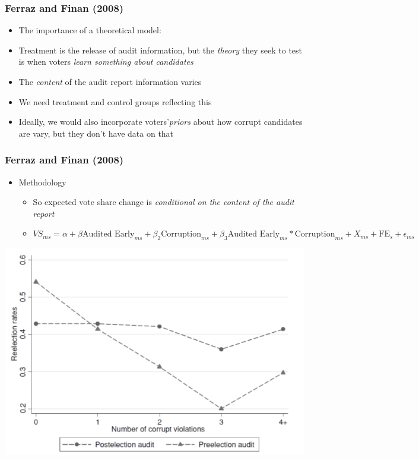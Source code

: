 \documentclass[xcolor=x11names,compress]{beamer}\usepackage[]{graphicx}\usepackage[]{color}
\renewcommand{\(}{\begin{columns}}
\renewcommand{\)}{\end{columns}}
\newcommand{\<}[1]{\begin{column}{#1}}
\renewcommand{\>}{\end{column}}
\begin{document}
\begin{frame}
\frametitle{Ferraz and Finan (2008)}
\begin{itemize}
\item The importance of a theoretical model:
\pause
\item Treatment is the release of audit information, but the \textit{theory} they seek to test is when voters \textit{learn something about candidates}
\pause
\item The \textit{content} of the audit report information varies
\pause
\item We need treatment and control groups reflecting this
\pause
\item Ideally, we would also incorporate voters'\textit{priors} about how corrupt candidates are vary, but they don't have data on that
\end{itemize}
\end{frame}

\begin{frame}
\frametitle{Ferraz and Finan (2008)}
\begin{itemize}
\item Methodology
\begin{itemize}
\item So expected vote share change is \textit{conditional on the content of the audit report}
\pause
\item $VS_{ms} = \alpha + \beta \text{Audited Early}_{ms} + \beta_2 \text{Corruption}_{ms} + \beta_3 \text{Audited Early}_{ms}*\text{Corruption}_{ms} + X_{ms} + \text{FE}_{s} + \epsilon_{ms}$
\end{itemize}
\end{itemize}
\end{frame}

\begin{frame}
\begin{center}
\includegraphics[scale=0.45]{Chart_FF.png}
\end{center}
\end{frame}
\end{document}
